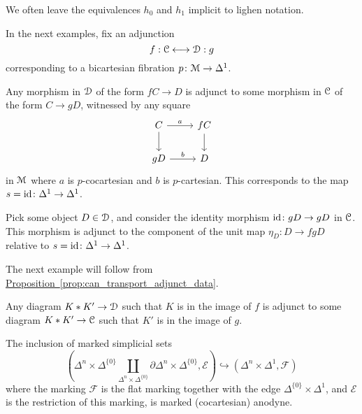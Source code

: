\documentclass[main.tex]{subfiles}
\begin{document}
We often leave the equivalences $h_{0}$ and $h_{1}$ implicit to lighen notation.

In the next examples, fix an adjunction
\begin{equation*}
  f : \mathcal{C} \longleftrightarrow \mathcal{D} : g
\end{equation*}
corresponding to a bicartesian fibration $p\colon \mathcal{M} \to \Delta^{1}$.

\begin{example}
  Any morphism in $\mathcal{D}$ of the form $fC \to D$ is adjunct to some morphism in $\mathcal{C}$ of the form $C \to gD$, witnessed by any square
  \begin{equation*}
    \begin{tikzcd}
      C
      \arrow[r, "a"]
      \arrow[d]
      & fC
      \arrow[d]
      \\
      gD
      \arrow[r, "b"]
      & D
    \end{tikzcd}
  \end{equation*}
  in $\mathcal{M}$ where $a$ is $p$-cocartesian and $b$ is $p$-cartesian. This corresponds to the map $s = \mathrm{id}\colon \Delta^{1} \to \Delta^{1}$.
\end{example}

\begin{example}
  Pick some object $D \in \mathcal{D}$, and consider the identity morphism $\mathrm{id}\colon gD \to gD$ in $\mathcal{C}$. This morphism is adjunct to the component of the unit map $\eta_{D}\colon D \to fgD$ relative to $s = \mathrm{id}\colon \Delta^{1} \to \Delta^{1}$.
\end{example}

The next example will follow from \hyperref[prop:can_transport_adjunct_data]{Proposition~\ref*{prop:can_transport_adjunct_data}}.

\begin{example}
  Any diagram $K \ast K' \to \mathcal{D}$ such that $K$ is in the image of $f$ is adjunct to some diagram $K \ast K' \to \mathcal{C}$ such that $K'$ is in the image of $g$.
\end{example}

\begin{lemma}
  \label{lemma:left_cylinder_inclusion_marked_anodyne}
  The inclusion of marked simplicial sets
  \begin{equation}
    \label{eq:cocartesian_anodyne_morphism}
    \left( \Delta^{n} \times \Delta^{\{0\}} \coprod_{\Delta^{n} \times \Delta^{\{0\}}} \partial \Delta^{n} \times \Delta^{\{0\}}, \mathcal{E} \right) \hookrightarrow (\Delta^{n} \times \Delta^{1}, \mathcal{F})
  \end{equation}
  where the marking $\mathcal{F}$ is the flat marking together with the edge $\Delta^{\{0\}} \times \Delta^{1}$, and $\mathcal{E}$ is the restriction of this marking, is marked (cocartesian) anodyne.
\end{lemma}
\end{document}
